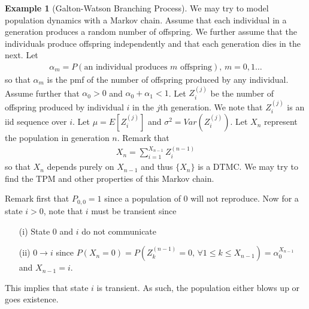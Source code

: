 \documentclass[11pt]{amsart}
\theoremstyle{definition}
\newtheorem{example}[theorem]{Example}
\numberwithin{equation}{section}
\begin{document}
 \begin{example}[Galton-Watson Branching Process]
 We may try to model population dynamics with a Markov chain. Assume that each individual in a generation produces a random number of offspring. We further assume that the individuals produce offspring independently and that each generation dies in the next. Let
 \begin{align*}
     \alpha_m=P(\text{an individual produces }m\text{ offspring}),\,m=0,1\ldots
 \end{align*}
 so that $\alpha_m$ is the pmf of the number of offspring produced by any individual. Assume further that $\alpha_0>0$ and $\alpha_0+\alpha_1<1$. Let $Z_i^{(j)}$ be the number of offspring produced by individual $i$ in the $j$th generation. We note that $Z_i^{(j)}$ is an iid sequence over $i$. Let $\mu=E[Z_i^{(j)}]$ and $\sigma^2=Var(Z_i^{(j)})$. Let $X_n$ represent the population in generation $n$. Remark that
 \begin{align*}
     X_n=\sum_{i=1}^{X_{n-1}}Z_i^{(n-1)}
 \end{align*}
 so that $X_n$ depends purely on $X_{n-1}$ and thus $\{X_n\}$ is a DTMC. We may try to find the TPM and other properties of this Markov chain.

 Remark first that $P_{0,0}=1$ since a population of $0$ will not reproduce. Now for a state $i>0$, note that $i$ must be transient since
 \begin{enumerate}
     \item [(i)] State 0 and $i$ do not communicate
     \item [(ii)] $0\to i$ since $P(X_n=0)=P(Z_k^{(n-1)}=0,\,\forall 1\le k\le X_{n-1})=\alpha_0^{X_{n-1}}$ and $X_{n-1}=i$.
 \end{enumerate}
 This implies that state $i$ is transient. As such, the population either blows up or goes existence.


\end{example}
\end{document}
